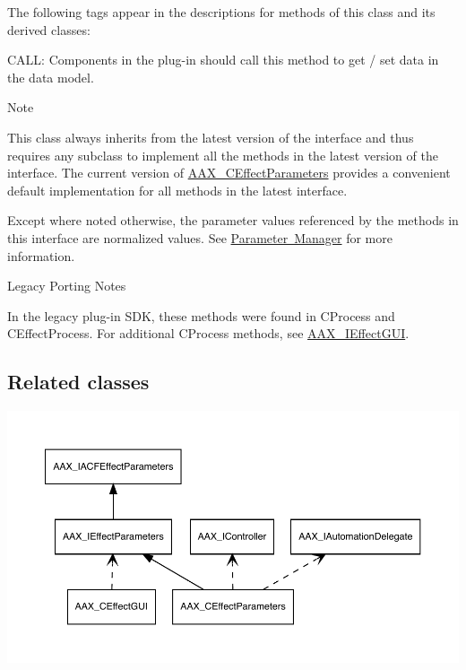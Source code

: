The following tags appear in the descriptions for methods of this class and its derived classes\+: \begin{DoxyItemize}
\item {\ttfamily C\+A\+LL\+:} Components in the plug-\/in should call this method to get / set data in the data model.\end{DoxyItemize}
\begin{DoxyNote}{Note}
\begin{DoxyItemize}
\item This class always inherits from the latest version of the interface and thus requires any subclass to implement all the methods in the latest version of the interface. The current version of \mbox{\hyperlink{a01481}{A\+A\+X\+\_\+\+C\+Effect\+Parameters}} provides a convenient default implementation for all methods in the latest interface. \item Except where noted otherwise, the parameter values referenced by the methods in this interface are normalized values. See \mbox{\hyperlink{a00814}{Parameter Manager}} for more information.\end{DoxyItemize}

\end{DoxyNote}
\begin{DoxyRefDesc}{Legacy Porting Notes}
\item[\mbox{\hyperlink{a00787__porting_notes000038}{Legacy Porting Notes}}]In the legacy plug-\/in S\+DK, these methods were found in C\+Process and {\ttfamily C\+Effect\+Process}. For additional {\ttfamily C\+Process} methods, see \mbox{\hyperlink{a01821}{A\+A\+X\+\_\+\+I\+Effect\+G\+UI}}.\end{DoxyRefDesc}
\hypertarget{a01825_AAX_IEffectParameters_relclass}{}\subsection{Related classes}\label{a01825_AAX_IEffectParameters_relclass}

\begin{DoxyImage}
\includegraphics[width=\textwidth,height=\textheight/2,keepaspectratio=true]{dot_aax_ieffectparams_related}
\end{DoxyImage}

